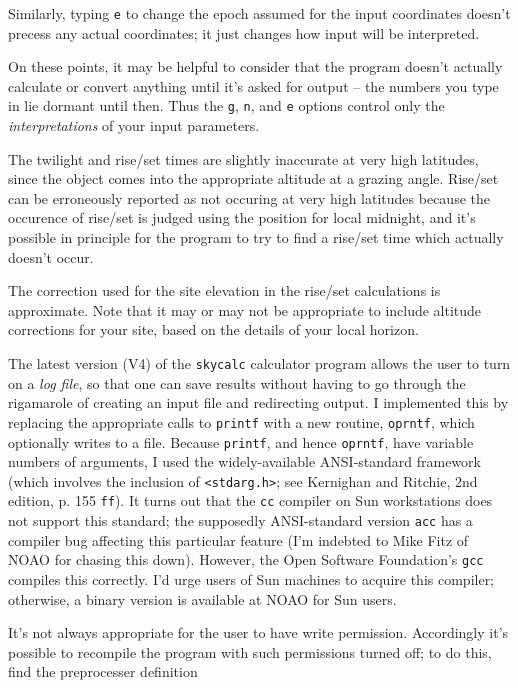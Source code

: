 Similarly, typing {\tt e} to change the epoch assumed for the input
coordinates doesn't precess any actual coordinates; it just changes
how input will be interpreted.

On these points, it may
be helpful to consider that the program doesn't actually calculate or
convert anything until it's asked for output -- the numbers you type
in lie dormant until then.  Thus the {\tt g}, {\tt n}, and {\tt e} options
control only the {\it interpretations} of your input parameters.

The twilight and rise/set times are slightly inaccurate at
very high latitudes, since the object comes into the appropriate
altitude at a grazing angle.  Rise/set can be erroneously
reported as not occuring at very high latitudes because the
occurence of rise/set is judged using the position for local
midnight, and it's possible in principle for the program to 
try to find a rise/set time which actually doesn't occur.

The correction used for the site elevation in the rise/set
calculations is approximate.  Note that 
it may or may not be appropriate to include altitude corrections
for your site, based on the details of your local horizon.


The latest version (V4) of the {\tt skycalc} calculator program 
allows the user to turn on a {\it log file}, so that one can
save results without having to go through the rigamarole of
creating an input file and redirecting output.  I implemented this
by replacing the appropriate calls to {\tt printf} with a new routine,
{\tt oprntf}, which optionally writes to a file.  Because
{\tt printf}, and hence {\tt oprntf}, have variable numbers of arguments, 
I used the widely-available ANSI-standard framework (which involves
the inclusion of {\tt <stdarg.h>}; see 
Kernighan and Ritchie, 2nd edition, p. 155 {\tt ff}).  It turns out that
the {\tt cc} compiler on Sun workstations does not support this
standard; the supposedly ANSI-standard version {\tt acc} has
a compiler bug affecting this particular feature (I'm indebted to
Mike Fitz of NOAO for chasing this down).  However, the Open
Software Foundation's {\tt gcc} compiles this correctly.  I'd
urge users of Sun machines to acquire this compiler; otherwise,
a binary version is available at NOAO for Sun users.  

It's not always appropriate for the user to have write permission.
Accordingly it's possible to recompile the program with such
permissions turned off; to do this, find the preprocesser definition 

